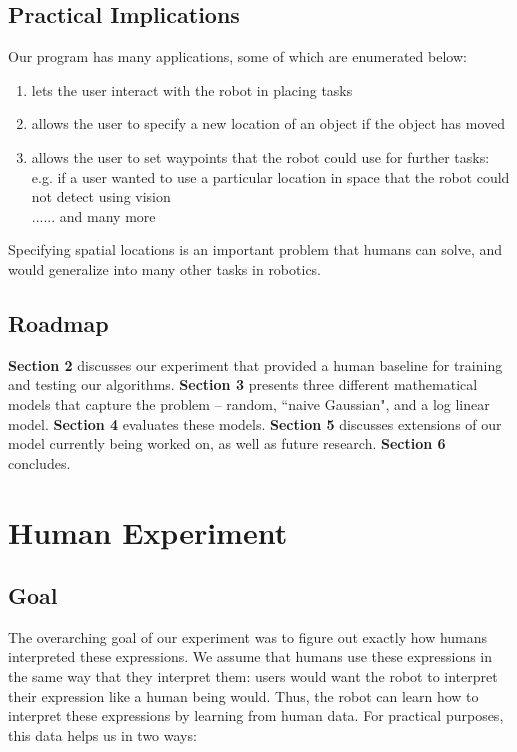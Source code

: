 \documentclass[12pt,letterpaper]{article}
\begin{document}
\subsection{Practical Implications}

Our program has many applications, some of which are enumerated below:\\

\begin{enumerate}[(1)]
\item lets the user interact with the robot in placing tasks
\item allows the user to specify a new location of an object if the object has moved
\item allows the user to set waypoints that the robot could use for further tasks: e.g. if a user wanted to use a particular location in space that the robot could not detect using vision \\
...... and many more
\end{enumerate}

Specifying spatial locations is an important problem that humans can solve, and would generalize into many other tasks in robotics. 

\subsection{Roadmap}

\textbf{Section 2} discusses our experiment that provided a human baseline for training and testing our algorithms. \textbf{Section 3} presents three different mathematical models that capture the problem \--- random, ``naive Gaussian", and a log linear model.  \textbf{Section 4} evaluates these models. \textbf{Section 5} discusses extensions of our model currently being worked on, as well as future research. \textbf{Section 6} concludes.

\section{Human Experiment}

\subsection{Goal}

The overarching goal of our experiment was to figure out exactly how humans interpreted these expressions. We assume that humans use these expressions in the same way that they interpret them: users would want the robot to interpret their expression like a human being would. Thus, the robot can learn how to interpret these expressions by learning from human data. For practical purposes, this data helps us in two ways:\\
\end{document}
